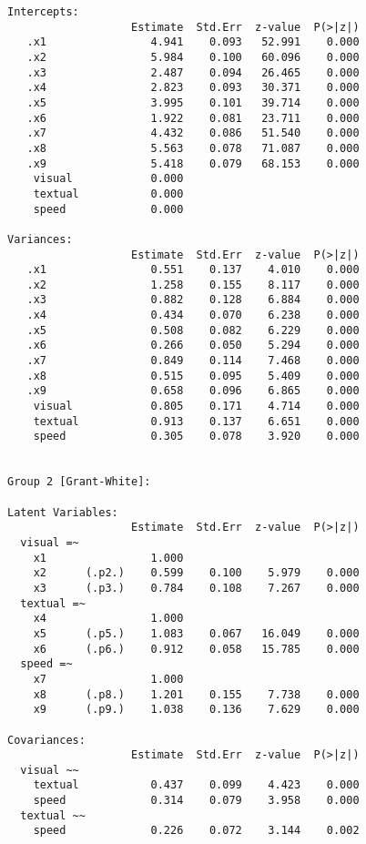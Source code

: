 \begin{verbatim}
Intercepts:
                   Estimate  Std.Err  z-value  P(>|z|)
   .x1                4.941    0.093   52.991    0.000
   .x2                5.984    0.100   60.096    0.000
   .x3                2.487    0.094   26.465    0.000
   .x4                2.823    0.093   30.371    0.000
   .x5                3.995    0.101   39.714    0.000
   .x6                1.922    0.081   23.711    0.000
   .x7                4.432    0.086   51.540    0.000
   .x8                5.563    0.078   71.087    0.000
   .x9                5.418    0.079   68.153    0.000
    visual            0.000                           
    textual           0.000                           
    speed             0.000                           

Variances:
                   Estimate  Std.Err  z-value  P(>|z|)
   .x1                0.551    0.137    4.010    0.000
   .x2                1.258    0.155    8.117    0.000
   .x3                0.882    0.128    6.884    0.000
   .x4                0.434    0.070    6.238    0.000
   .x5                0.508    0.082    6.229    0.000
   .x6                0.266    0.050    5.294    0.000
   .x7                0.849    0.114    7.468    0.000
   .x8                0.515    0.095    5.409    0.000
   .x9                0.658    0.096    6.865    0.000
    visual            0.805    0.171    4.714    0.000
    textual           0.913    0.137    6.651    0.000
    speed             0.305    0.078    3.920    0.000


Group 2 [Grant-White]:

Latent Variables:
                   Estimate  Std.Err  z-value  P(>|z|)
  visual =~                                           
    x1                1.000                           
    x2      (.p2.)    0.599    0.100    5.979    0.000
    x3      (.p3.)    0.784    0.108    7.267    0.000
  textual =~                                          
    x4                1.000                           
    x5      (.p5.)    1.083    0.067   16.049    0.000
    x6      (.p6.)    0.912    0.058   15.785    0.000
  speed =~                                            
    x7                1.000                           
    x8      (.p8.)    1.201    0.155    7.738    0.000
    x9      (.p9.)    1.038    0.136    7.629    0.000

Covariances:
                   Estimate  Std.Err  z-value  P(>|z|)
  visual ~~                                           
    textual           0.437    0.099    4.423    0.000
    speed             0.314    0.079    3.958    0.000
  textual ~~                                          
    speed             0.226    0.072    3.144    0.002


\end{verbatim}
